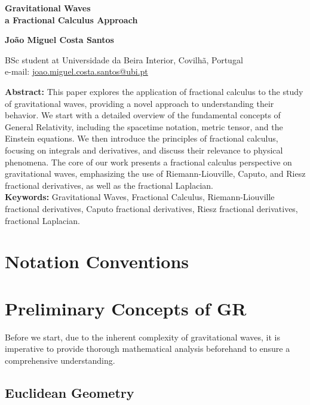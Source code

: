 \documentclass[a4paper,12pt]{extarticle}
\numberwithin{equation}{subsection}
\begin{document}
\begin{center}
{\LARGE \bf Gravitational Waves \\[.6ex] 
\large a Fractional Calculus Approach}
\vspace{8mm}

{\large \bf João Miguel Costa Santos}
\vspace{3mm}


BSc student at Universidade da Beira Interior, Covilhã, Portugal \\
e-mail: \url{joao.miguel.costa.santos@ubi.pt}
\vspace{2mm}


\end{center}
\vspace{10mm}
\noindent
{\bf Abstract:} This paper explores the application of fractional calculus to the study of gravitational waves, providing a novel approach to understanding their behavior. We start with a detailed overview of the fundamental concepts of General Relativity, including the spacetime notation, metric tensor, and the Einstein equations. We then introduce the principles of fractional calculus, focusing on integrals and derivatives, and discuss their relevance to physical phenomena. The core of our work presents a fractional calculus perspective on gravitational waves, emphasizing the use of Riemann-Liouville, Caputo, and Riesz fractional derivatives, as well as the fractional Laplacian.\\[.5em]
{\bf Keywords:} Gravitational Waves, Fractional Calculus,  Riemann-Liouville fractional derivatives,  Caputo fractional derivatives,  Riesz fractional derivatives, fractional Laplacian.\\
\vspace{4mm}
\tableofcontents
\clearpage
\newpage
\pagestyle{headings}
\setcounter{page}{1}
\section{Notation Conventions}

\newpage
\section{Preliminary Concepts of GR}
Before we start, due to the inherent complexity of gravitational waves, it is imperative to provide thorough mathematical analysis beforehand to ensure a comprehensive understanding.
\subsection{Euclidean Geometry}







\end{document}
